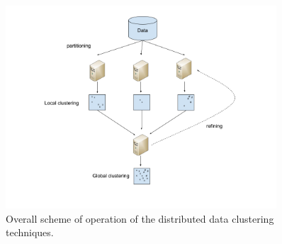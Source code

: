 \documentclass[10pt]{article}
\begin{document}
\begin{figure}[!h]
    \centering
    \includegraphics[width=0.9\textwidth]{distributed_data_clustering_scheme_en.png}
    \caption{Overall scheme of operation of the distributed data clustering techniques.}
    \label{fig:distributed_clustering}
\end{figure}

\end{document}
